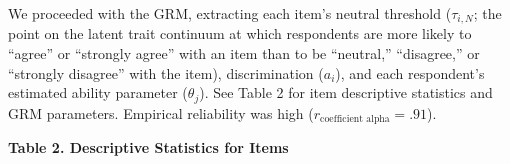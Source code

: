 \documentclass[
]{agujournal2019}
\begin{document}
We proceeded with the GRM, extracting each item's neutral threshold
(\(\tau_{i,N}\); the point on the latent trait continuum at which
respondents are more likely to ``agree'' or ``strongly agree'' with an
item than to be ``neutral,'' ``disagree,'' or ``strongly disagree'' with
the item), discrimination (\(a_i\)), and each respondent's estimated
ability parameter (\(\theta_j\)). See Table 2 for item descriptive
statistics and GRM parameters. Empirical reliability was high
(\(r_{\text{coefficient alpha}} = .91\)).

\begin{tcolorbox}[enhanced jigsaw, leftrule=.75mm, colframe=quarto-callout-note-color-frame, breakable, colback=white, left=2mm, toprule=.15mm, opacityback=0, arc=.35mm, bottomrule=.15mm, rightrule=.15mm]

\vspace{-3mm}\textbf{Table 2. Descriptive Statistics for Items}\vspace{3mm}


\end{tcolorbox}
\end{document}
